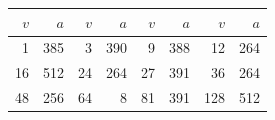 \begin{center}\scriptsize\begin{tabular}{rr|rr|rr|rr}\toprule
$v$ & $a$ & $v$ & $a$ & $v$ & $a$ & $v$ & $a$\\\midrule
1 & 385 & 3 & 390 & 9 & 388 & 12 & 264\\
16 & 512 & 24 & 264 & 27 & 391 & 36 & 264\\
48 & 256 & 64 & 8 & 81 & 391 & 128 & 512\\
\bottomrule\end{tabular}\end{center}
